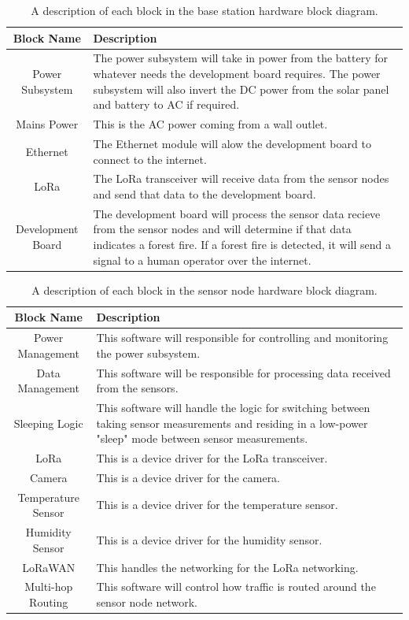 \documentclass{article}
\begin{document}
\begin{table}[H]
    \centering
    \caption{A description of each block in the base station hardware block diagram.}
    \begin{tabularx}{\linewidth}{|c|X|}
        \hline
        Block Name & Description \\ 
        \hline
        Power Subsystem & The power subsystem will take in power from the battery for whatever needs the development board requires. The power subsystem will also invert the DC power from the solar panel and battery to AC if required. \\\hline
        Mains Power & This is the AC power coming from a wall outlet. \\\hline
        Ethernet & The Ethernet module will alow the development board to connect to the internet. \\\hline
        LoRa & The LoRa transceiver will receive data from the sensor nodes and send that data to the development board. \\\hline
        Development Board & The development board will process the sensor data recieve from the sensor nodes and will determine if that data indicates a forest fire. If a forest fire is detected, it will send a signal to a human operator over the internet. \\\hline
    \end{tabularx}
    \label{tab:descHWBaseStationBD}
\end{table}

\begin{table}[H]
    \centering
    \caption{A description of each block in the sensor node hardware block diagram.}
    \begin{tabularx}{\linewidth}{|c|X|}
        \hline
        Block Name & Description \\ 
        \hline
        Power Management & This software will responsible for controlling and monitoring the power subsystem.  \\\hline
        Data Management & This software will be responsible for processing data received from the sensors. \\\hline
        Sleeping Logic & This software will handle the logic for switching between taking sensor measurements and residing in a low-power "sleep" mode between sensor measurements. \\\hline
        LoRa & This is a device driver for the LoRa transceiver. \\\hline
        Camera & This is a device driver for the camera. \\\hline
        Temperature Sensor & This is a device driver for the temperature sensor. \\\hline
        Humidity Sensor & This is a device driver for the humidity sensor. \\\hline
        LoRaWAN & This handles the networking for the LoRa networking. \\\hline
        Multi-hop Routing & This software will control how traffic is routed around the sensor node network. \\\hline
    \end{tabularx}
    \label{tab:descSWNodeBD}
\end{table}
\end{document}
